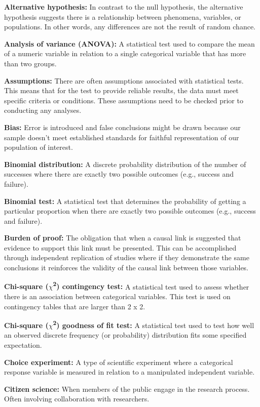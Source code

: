 \documentclass[
]{book}
\begin{document}
\textbf{Alternative hypothesis:} In contrast to the null hypothesis, the alternative hypothesis suggests there is a relationship between phenomena, variables, or populations. In other words, any differences are not the result of random chance.

\textbf{Analysis of variance (ANOVA):} A statistical test used to compare the mean of a numeric variable in relation to a single categorical variable that has more than two groups.

\textbf{Assumptions:} There are often assumptions associated with statistical tests. This means that for the test to provide reliable results, the data must meet specific criteria or conditions. These assumptions need to be checked prior to conducting any analyses.

\textbf{Bias:} Error is introduced and false conclusions might be drawn because our sample doesn't meet established standards for faithful representation of our population of interest.

\textbf{Binomial distribution:} A discrete probability distribution of the number of successes where there are exactly two possible outcomes (e.g., success and failure).

\textbf{Binomial test:} A statistical test that determines the probability of getting a particular proportion when there are exactly two possible outcomes (e.g., success and failure).

\textbf{Burden of proof:} The obligation that when a causal link is suggested that evidence to support this link must be presented. This can be accomplished through independent replication of studies where if they demonstrate the same conclusions it reinforces the validity of the causal link between those variables.

\textbf{Chi-square (\(\chi\)\textsuperscript{2}) contingency test:} A statistical test used to assess whether there is an association between categorical variables. This test is used on contingency tables that are larger than 2 x 2.

\textbf{Chi-square (\(\chi\)\textsuperscript{2}) goodness of fit test:} A statistical test used to test how well an observed discrete frequency (or probability) distribution fits some specified expectation.

\textbf{Choice experiment:} A type of scientific experiment where a categorical response variable is measured in relation to a manipulated independent variable.

\textbf{Citizen science:} When members of the public engage in the research process. Often involving collaboration with researchers.
\end{document}
